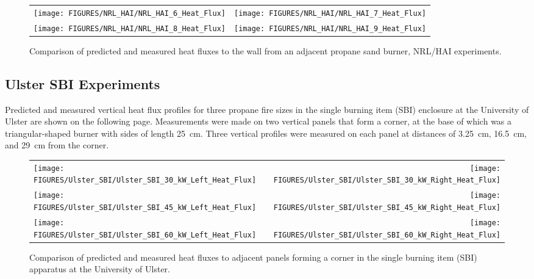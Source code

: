 \begin{figure}[p]
\begin{tabular*}{\textwidth}{l@{\extracolsep{\fill}}r}
\texttt{[image: FIGURES/NRL\_HAI/NRL\_HAI\_6\_Heat\_Flux]} &
\texttt{[image: FIGURES/NRL\_HAI/NRL\_HAI\_7\_Heat\_Flux]} \\
\texttt{[image: FIGURES/NRL\_HAI/NRL\_HAI\_8\_Heat\_Flux]} &
\texttt{[image: FIGURES/NRL\_HAI/NRL\_HAI\_9\_Heat\_Flux]}
\end{tabular*}
\label{NRL_HAI_2}
\caption[Wall heat flux predictions, NRL/HAI experiments.]
{Comparison of predicted and measured heat fluxes to the wall from an adjacent propane sand burner, NRL/HAI experiments.}
\end{figure}



\clearpage





\subsection{Ulster SBI Experiments}

Predicted and measured vertical heat flux profiles for three propane fire sizes in the single burning item (SBI) enclosure at the University of Ulster are shown on the following page. Measurements were made on two vertical panels that form a corner, at the base of which was a triangular-shaped burner with sides of length 25~cm. Three vertical profiles were measured on each panel at distances of 3.25~cm, 16.5~cm, and 29~cm from the corner.

\begin{figure}[h!]
\begin{tabular*}{\textwidth}{l@{\extracolsep{\fill}}r}
\texttt{[image: FIGURES/Ulster\_SBI/Ulster\_SBI\_30\_kW\_Left\_Heat\_Flux]} &
\texttt{[image: FIGURES/Ulster\_SBI/Ulster\_SBI\_30\_kW\_Right\_Heat\_Flux]} \\
\texttt{[image: FIGURES/Ulster\_SBI/Ulster\_SBI\_45\_kW\_Left\_Heat\_Flux]} &
\texttt{[image: FIGURES/Ulster\_SBI/Ulster\_SBI\_45\_kW\_Right\_Heat\_Flux]} \\
\texttt{[image: FIGURES/Ulster\_SBI/Ulster\_SBI\_60\_kW\_Left\_Heat\_Flux]} &
\texttt{[image: FIGURES/Ulster\_SBI/Ulster\_SBI\_60\_kW\_Right\_Heat\_Flux]}
\end{tabular*}
\label{Ulster_SBI}
\caption[Corner heat flux predictions, Ulster SBI experiments]
{Comparison of predicted and measured heat fluxes to adjacent panels forming a corner in the single
burning item (SBI) apparatus at the University of Ulster.}
\end{figure}

